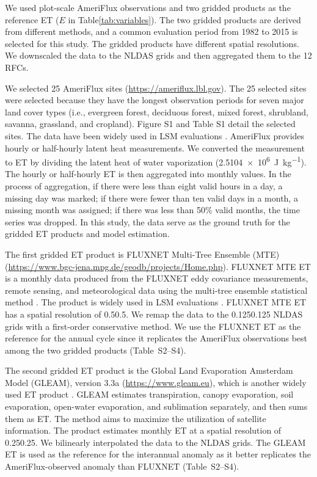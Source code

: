 \documentclass[essd, manuscript]{copernicus}
\begin{document}
We used plot-scale AmeriFlux observations and two gridded products as the reference ET (\(E\) in Table\ref{tab:variables}). The two gridded products are derived from different methods, and a common evaluation period from 1982 to 2015 is selected for this study. The gridded products have different spatial resolutions. We downscaled the data to the NLDAS grids and then aggregated them to the 12 RFCs.

We selected 25 AmeriFlux sites (\url{https://ameriflux.lbl.gov}). The 25 selected sites were selected because they have the longest observation periods for seven major land cover types (i.e., evergreen forest, deciduous forest, mixed forest, shrubland, savanna, grassland, and cropland). Figure S1 and Table S1 detail the selected sites. The data have been widely used in LSM evaluations \citep{cai2014JGRA, zhang2020AFM}. AmeriFlux provides hourly or half-hourly latent heat measurements. We converted the measurement to ET by dividing the latent heat of water vaporization (\qty{2.5104e6}{J.kg^{-1}}). The hourly or half-hourly ET is then aggregated into monthly values. In the process of aggregation, if there were less than eight valid hours in a day, a missing day was marked; if there were fewer than ten valid days in a month, a missing month was assigned; if there was less than 50\% valid months, the time series was dropped. In this study, the data serve as the ground truth for the gridded ET products and model estimation.

The first gridded ET product is FLUXNET Multi-Tree Ensemble (MTE) \citep{jung2009B} (\url{https://www.bgc-jena.mpg.de/geodb/projects/Home.php}). FLUXNET MTE ET is a monthly data produced from the FLUXNET eddy covariance measurements, remote sensing, and meteorological data using the multi-tree ensemble statistical method \citep{jung2009B}. The product is widely used in LSM evaluations \citep{cai2014JGRA, ma2017JGRA, xia2016JGRA, jung2019SD, fang2020AFM, zhang2020AFM, pan2020HESS}. FLUXNET MTE ET has a spatial resolution of 0.5\degree{}\times{}0.5\degree{}. We remap the data to the 0.125\degree{}\times{}0.125\degree{} NLDAS grids with a first-order conservative method. We use the FLUXNET ET as the reference for the annual cycle since it replicates the AmeriFlux observations best among the two gridded products (Table~S2--S4).

The second gridded ET product is the Global Land Evaporation Amsterdam Model (GLEAM), version 3.3a (\url{https://www.gleam.eu}), which is another widely used ET product \citep{xu2019JHa}. GLEAM estimates transpiration, canopy evaporation, soil evaporation, open-water evaporation, and sublimation separately, and then sums them as ET\@. The method aims to maximize the utilization of satellite information. The product estimates monthly ET at a spatial resolution of 0.25\degree{}\times{}0.25\degree{}. We bilinearly interpolated the data to the NLDAS grids. The GLEAM ET is used as the reference for the interannual anomaly as it better replicates the AmeriFlux-observed anomaly than FLUXNET (Table~S2--S4).
\end{document}
